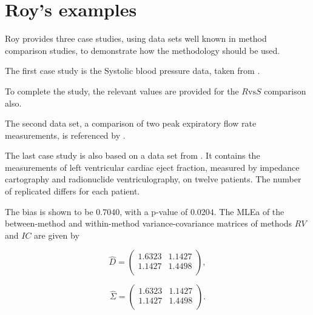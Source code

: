 \documentclass[12pt, a4paper]{report}
\theoremstyle{plain}
\theoremstyle{definition}
\theoremstyle{remark}
\begin{document}
	
	\section{Roy's examples}
	Roy provides three case studies, using data sets well known in method comparison studies, to demonstrate how the methodology should be used.
	
	
	
	The first case study is the Systolic blood pressure data, taken from \citet{BA99}.
	
	
	
	To complete the study, the relevant values are provided for the $R \mbox{vs} S$ comparison also.
	
	
	The second data set, a comparison of two peak expiratory flow rate measurements, is referenced by \citet{BA86}.
	
	
	The last case study is also based on a data set from  \citet{BA99}. It contains the measurements of left ventricular cardiac eject fraction, measured by impedance cartography and radionuclide ventriculography, on twelve patients.
	The number of replicated differs for each patient.
	
	The bias is shown to be $0.7040$, with a p-value of $0.0204$. The MLEa of the between-method and within-method variance-covariance matrices of methods $RV$ and $IC$ are given by
	
	\begin{equation}\hat{D}=\left(
	\begin{array}{cc}
	1.6323 & 1.1427 \\
	1.1427 & 1.4498 \\
	\end{array}
	\right),
	\end{equation}
	
	
	
	\begin{equation}\hat{\Sigma}=\left(
	\begin{array}{cc}
	1.6323 & 1.1427 \\
	1.1427 & 1.4498 \\
	\end{array}
	\right).
	\end{equation}
	
\end{document}
